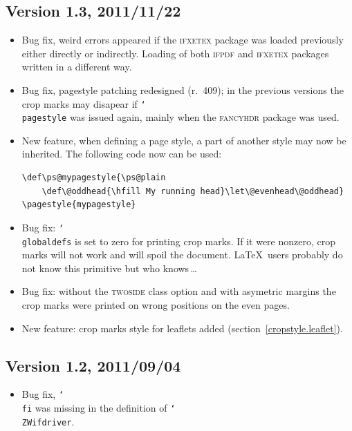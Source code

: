 \documentclass[11pt]{article}
\def\opt#1{\texorpdfstring{\textmd{\textsc{#1}}}{#1}}
\let\pkg\textsc
\DeclareRobustCommand\cmd[1]{\texttt{\char`\\#1}}
\let\zwcomma\,
\def\,{\texorpdfstring{\zwcomma}{}}
\begin{document}
\subsection{Version 1.3, 2011/11/22}
\begin{itemize}
\item Bug fix, weird errors appeared if the \pkg{ifxetex} package was loaded previously either
directly or indirectly. Loading of both \pkg{ifpdf} and \pkg{ifxetex} packages written in a different way.
\item Bug fix, pagestyle patching redesigned (r.~409); in the previous versions the crop marks may
disapear if \cmd{pagestyle} was issued again, mainly when the \pkg{fancyhdr} package was used.
\item New feature, when defining a page style, a part of another style may now be inherited. The
following code now can be used:
\begin{verbatim}
\def\ps@mypagestyle{\ps@plain
    \def\@oddhead{\hfill My running head}\let\@evenhead\@oddhead}
\pagestyle{mypagestyle}
\end{verbatim}
\item Bug fix: \cmd{globaldefs} is set to zero for printing crop marks. If it were nonzero,
crop marks will not work and will spoil the document. \LaTeX\ users probably do not know this
primitive but who knows\,\ldots
\item Bug fix: without the \opt{twoside} class option and with asymetric margins the crop marks were
printed on wrong positions on the even pages.
\item New feature: crop marks style for leaflets added (section~\ref{cropstyle.leaflet}).
\end{itemize}

\subsection{Version 1.2, 2011/09/04}
\begin{itemize}
\item Bug fix, \cmd{fi} was missing in the definition of \cmd{ZWifdriver}.
\end{itemize}
\end{document}
